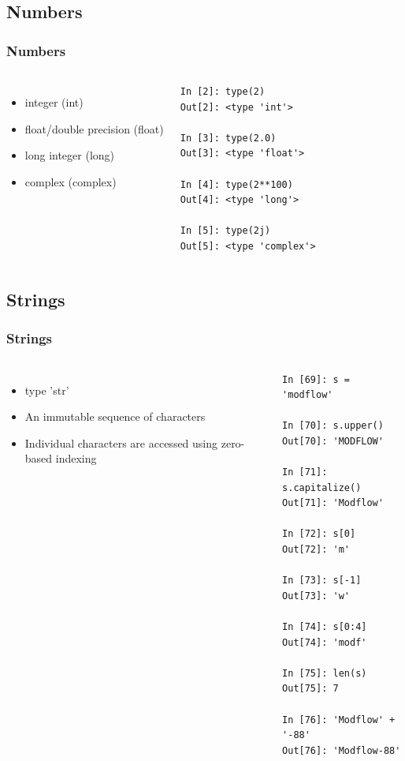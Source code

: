 \documentclass{beamer}
\begin{document}
\subsection{Numbers}

\begin{frame}[fragile]
\frametitle{Numbers}
\begin{columns}[c]
\column{2.5in}
\begin{itemize}
\item{integer (int)}
\item{float/double precision (float)}
\item{long integer (long)}
\item{complex (complex)}
\end{itemize}

\column{2.5in}
\begin{lstlisting}
In [2]: type(2)
Out[2]: <type 'int'>

In [3]: type(2.0)
Out[3]: <type 'float'>

In [4]: type(2**100)
Out[4]: <type 'long'>

In [5]: type(2j)
Out[5]: <type 'complex'>
\end{lstlisting}
\end{columns}
\end{frame}


\subsection{Strings}

\begin{frame}[fragile]
\frametitle{Strings}
\begin{columns}[c]
\column{2.5in}
\begin{itemize}
\item{type 'str'}
\item{An immutable sequence of characters}
\item{Individual characters are accessed using zero-based indexing}
\end{itemize}

\column{2.5in}
\tiny
\begin{lstlisting}
In [69]: s = 'modflow'

In [70]: s.upper()
Out[70]: 'MODFLOW'

In [71]: s.capitalize()
Out[71]: 'Modflow'

In [72]: s[0]
Out[72]: 'm'

In [73]: s[-1]
Out[73]: 'w'

In [74]: s[0:4]
Out[74]: 'modf'

In [75]: len(s)
Out[75]: 7

In [76]: 'Modflow' + '-88'
Out[76]: 'Modflow-88'
\end{lstlisting}
\end{columns}
\end{frame}
\end{document}
